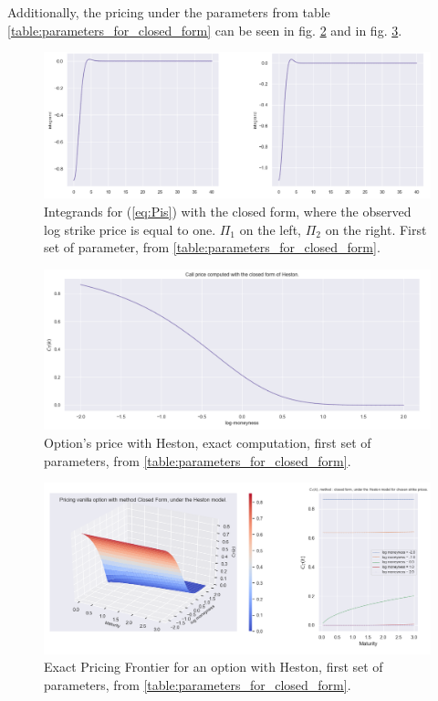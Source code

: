 Additionally, the pricing under the parameters from table  \ref{table:parameters_for_closed_form} can be seen in fig. \ref{fig:price_closed1} and in fig.
\ref{fig:price_closed2}.

\begin{figure}
\centering
   \includegraphics[width = 0.9 \textwidth]{../addition_part/images/integration_fft/closed_form_integrands.png}
	\caption{Integrands for (\ref{eq:Pis}) with the closed form, where the observed log strike price is equal to one. $\Pi_1$ on the left, $\Pi_2$ on the right. First set of parameter, from \ref{table:parameters_for_closed_form}.}
   \label{fig:integrands_closedform}
\end{figure}


\begin{figure}
\centering
   \includegraphics[width = 0.8 \textwidth]{../addition_part/images/integration_fft/pricing_closed_form_heston.png}
   \caption{Option's price with Heston, exact computation, first set of parameters, from \ref{table:parameters_for_closed_form}.}
   \label{fig:price_closed1}
\end{figure}


\begin{figure}
\centering
   \includegraphics[width = 0.9 \textwidth]{../addition_part/images/integration_fft/closed_form_pricing_surface&few_Heston.png}
   \caption{Exact Pricing Frontier for an option with Heston, first set of parameters, from \ref{table:parameters_for_closed_form}.}
   \label{fig:price_closed2}
\end{figure}




